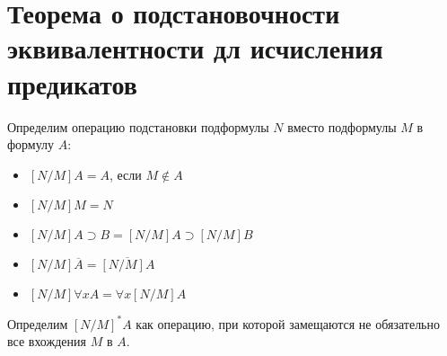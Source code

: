 \section{Теорема о подстановочности эквивалентности дл исчисления предикатов}

Определим операцию подстановки подформулы $N$ вместо подформулы $M$ в формулу $A$:
\begin{itemize}
    \item $[N/M]A=A$, если $M\notin A$
    \item $[N/M]M=N$
    \item $[N/M]A\supset B=[N/M]A \supset [N/M]B$
    \item $[N/M]\overline{A}=\overline{[N/M]A}$
    \item $[N/M]\forall x A=\forall x [N/M]A$
\end{itemize}

Определим $[N/M]^*A$ как операцию, при которой замещаются не обязательно все вхождения $M$ в $A$. 

